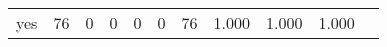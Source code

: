 \begin{longtable}{lp{1.10cm}p{1.10cm}p{1.10cm}p{1.10cm}p{1.10cm}p{1.10cm}p{1.10cm}p{1.10cm}p{1.10cm}p{1.10cm}}
yes       &                     76 &                                  0 &                                 0 &                                0 &                                 0 &                              76 &                          1.000 &                                 1.000 &                               1.000 \\
\end{longtable}
